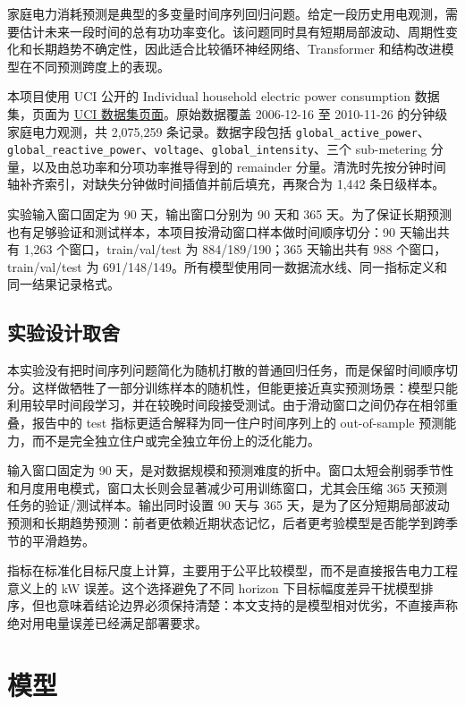 \documentclass[11pt,a4paper]{article}
\begin{document}
家庭电力消耗预测是典型的多变量时间序列回归问题。给定一段历史用电观测，需要估计未来一段时间的总有功功率变化。该问题同时具有短期局部波动、周期性变化和长期趋势不确定性，因此适合比较循环神经网络、Transformer 和结构改进模型在不同预测跨度上的表现。

本项目使用 UCI 公开的 Individual household electric power consumption 数据集，页面为 \href{https://archive.ics.uci.edu/dataset/235/individual+household+electric+power+consumption}{UCI 数据集页面}。原始数据覆盖 2006-12-16 至 2010-11-26 的分钟级家庭电力观测，共 2,075,259 条记录。数据字段包括 \texttt{global\_active\_power}、\texttt{global\_reactive\_power}、\texttt{voltage}、\texttt{global\_intensity}、三个 sub-metering 分量，以及由总功率和分项功率推导得到的 remainder 分量。清洗时先按分钟时间轴补齐索引，对缺失分钟做时间插值并前后填充，再聚合为 1,442 条日级样本。

实验输入窗口固定为 90 天，输出窗口分别为 90 天和 365 天。为了保证长期预测也有足够验证和测试样本，本项目按滑动窗口样本做时间顺序切分：90 天输出共有 1,263 个窗口，train/val/test 为 884/189/190；365 天输出共有 988 个窗口，train/val/test 为 691/148/149。所有模型使用同一数据流水线、同一指标定义和同一结果记录格式。

\subsection{实验设计取舍}

本实验没有把时间序列问题简化为随机打散的普通回归任务，而是保留时间顺序切分。这样做牺牲了一部分训练样本的随机性，但能更接近真实预测场景：模型只能利用较早时间段学习，并在较晚时间段接受测试。由于滑动窗口之间仍存在相邻重叠，报告中的 test 指标更适合解释为同一住户时间序列上的 out-of-sample 预测能力，而不是完全独立住户或完全独立年份上的泛化能力。

输入窗口固定为 90 天，是对数据规模和预测难度的折中。窗口太短会削弱季节性和月度用电模式，窗口太长则会显著减少可用训练窗口，尤其会压缩 365 天预测任务的验证/测试样本。输出同时设置 90 天与 365 天，是为了区分短期局部波动预测和长期趋势预测：前者更依赖近期状态记忆，后者更考验模型是否能学到跨季节的平滑趋势。

指标在标准化目标尺度上计算，主要用于公平比较模型，而不是直接报告电力工程意义上的 kW 误差。这个选择避免了不同 horizon 下目标幅度差异干扰模型排序，但也意味着结论边界必须保持清楚：本文支持的是模型相对优劣，不直接声称绝对用电量误差已经满足部署要求。

\section{模型}
\end{document}
